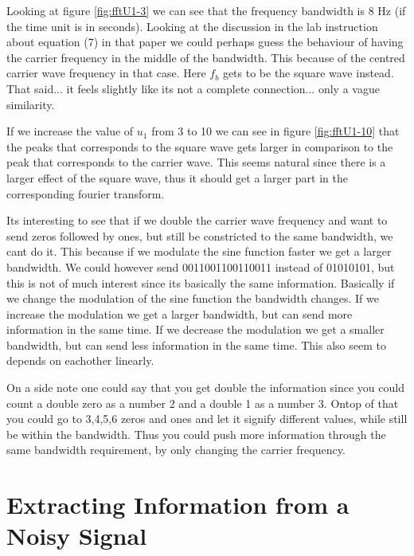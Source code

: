 \documentclass[11pt]{article}
\begin{document}
Looking at figure \ref{fig:fftU1-3} we can see that the frequency bandwidth is 8 Hz (if the time unit is in seconds). Looking at the discussion in the lab instruction about equation (7) in that paper we could perhaps guess the behaviour of having  the carrier frequency in the middle of the bandwidth. This because of the centred carrier wave frequency in that case. Here $f_b$ gets to be the square wave instead. That said... it feels slightly like its not a complete connection... only a vague similarity. 

If we increase the value of $u_1$ from 3 to 10 we can see in figure \ref{fig:fftU1-10} that the peaks that corresponds to the square wave gets larger in comparison to the peak that corresponds to the carrier wave. This seems natural since there is a larger effect of the square wave, thus it should get a larger part in the corresponding fourier transform. 

Its interesting to see that if we double the carrier wave frequency and want to send zeros followed by ones, but still be constricted to the same bandwidth, we cant do it. This because if we modulate the sine function faster we get a larger bandwidth. We could however send 0011001100110011 instead of 01010101, but this is not of much interest since its basically the same information. Basically if we change the modulation of the sine function the bandwidth changes. If we increase the modulation we get a larger bandwidth, but can send more information in the same time. If we decrease the modulation we get a smaller bandwidth, but can send less information in the same time. This also seem to depends on eachother linearly. 

On a side note one could say that you get double the information since you could count a double zero as a number 2 and a double 1 as a number 3. Ontop of that you could go to 3,4,5,6 zeros and ones and let it signify different values, while still be within the bandwidth. Thus you could push more information through the same bandwidth requirement, by only changing the carrier frequency. 

\section{Extracting Information from a Noisy Signal}
\end{document}
